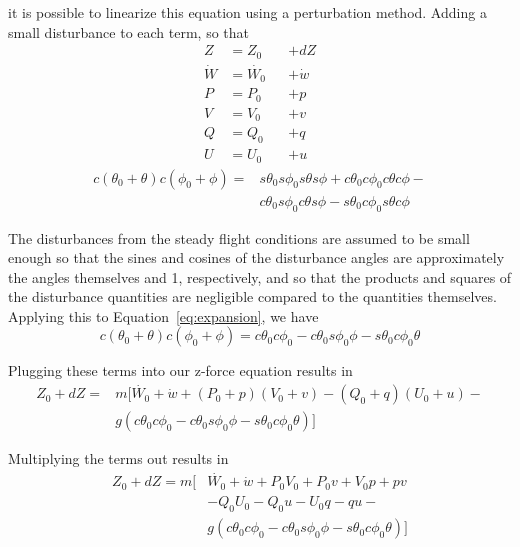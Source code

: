 \documentclass[a4paper]{article}
\begin{document}
\noindent it is possible to linearize this equation using a perturbation method. Adding a small disturbance to each term, so that
\begin{equation*}
\begin{alignedat}{2}
Z &= Z_0 & &+ dZ \\
\dot{W} &= \dot{W_0} & &+ \dot{w} \\
P &= P_0 & &+ p \\
V &= V_0 & &+ v \\
Q &= Q_0 & &+ q \\
U &= U_0 & &+ u
\end{alignedat}
\end{equation*}
\begin{equation} \label{eq:expansion}
\begin{split}
c(\theta_0 + \theta)c(\phi_0 + \phi) = & s\theta_0  s\phi_0 s\theta s\phi + c\theta_0 c\phi_0  c\theta c\phi - \\
                                       & c\theta_0  s\phi_0  c\theta s\phi - s\theta_0 c\phi_0 s\theta c\phi
\end{split}
\end{equation}

\noindent The disturbances from the steady flight conditions are assumed to be small enough so that the sines and cosines of the disturbance angles are approximately the angles themselves and 1, respectively, and so that the products and squares of the disturbance quantities are negligible compared to the quantities themselves. \\

\noindent Applying this to Equation~\ref{eq:expansion}, we have
\begin{equation*}
c(\theta_0 + \theta)c(\phi_0 + \phi) = c\theta_0 c\phi_0  - c\theta_0  s\phi_0 \phi - s\theta_0 c\phi_0 \theta
\end{equation*}

\noindent Plugging these terms into our z-force equation results in
\begin{equation*}
\begin{split}
Z_0 + dZ = & m [\dot{W_0} + \dot{w} + (P_0 + p) (V_0 + v) - (Q_0 + q) (U_0 + u) - \\ 
    & g (c\theta_0 c\phi_0  - c\theta_0  s\phi_0 \phi - s\theta_0 c\phi_0 \theta)]
\end{split}
\end{equation*}

\noindent Multiplying the terms out results in
\begin{equation*}
\begin{split}
Z_0 + dZ = m[ & \dot{W_0} + \dot{w} + P_0 V_0 + P_0 v + V_0 p + p v \\
       & - Q_0 U_0 - Q_0 u - U_0 q - q u - \\
       & g (c\theta_0 c\phi_0  - c\theta_0  s\phi_0 \phi - s\theta_0 c\phi_0 \theta)]
\end{split}
\end{equation*}
\end{document}
